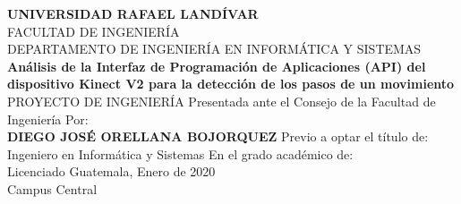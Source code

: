 \begin{center}
{\LARGE \textbf{UNIVERSIDAD RAFAEL LAND\'IVAR}}\\[0.1cm]
{\normalsize FACULTAD DE INGENIER\'IA}\\[0.1cm]
{\normalsize DEPARTAMENTO DE INGENIER\'IA EN INFORM\'ATICA Y SISTEMAS}\\[4cm]
{\huge \textbf{An\'alisis de
la Interfaz de Programaci\'on de Aplicaciones (API) del dispositivo Kinect V2 para la detecci\'on de
los pasos de un movimiento}}\\[0.1cm]
{\LARGE PROYECTO DE INGENIER\'IA}
\vfill
{\LARGE Presentada ante el Consejo de la Facultad de Ingenier\'ia}
\vfill
{\LARGE Por:}\\[0.1cm]
{\LARGE \textbf{DIEGO JOS\'E ORELLANA BOJORQUEZ}}
\vfill
Previo a optar el t\'itulo de:\\[0.1cm]
Ingeniero en Inform\'atica y Sistemas
\vfill
En el grado acad\'emico de:\\[0.1cm]
Licenciado
\vfill
Guatemala, Enero de 2020\\[0.1cm]
Campus Central
\end{center}